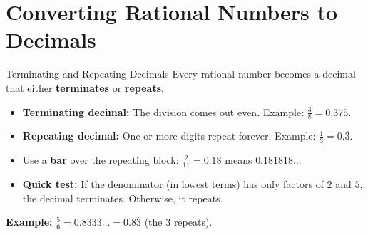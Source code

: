 \section{Converting Rational Numbers to Decimals}

\begin{quickReview}{Terminating and Repeating Decimals}
Every rational number becomes a decimal that either \textbf{terminates} or \textbf{repeats}.

\begin{itemize}[leftmargin=*]
    \item \textbf{Terminating decimal:} The division comes out even. Example: $\frac{3}{8} = 0.375$.
    \item \textbf{Repeating decimal:} One or more digits repeat forever. Example: $\frac{1}{3} = 0.\overline{3}$.
    \item Use a \textbf{bar} over the repeating block: $\frac{2}{11} = 0.\overline{18}$ means $0.181818\ldots$
    \item \textbf{Quick test:} If the denominator (in lowest terms) has only factors of $2$ and $5$, the decimal terminates. Otherwise, it repeats.
\end{itemize}

\medskip
\textbf{Example:} $\frac{5}{6} = 0.8333\ldots = 0.8\overline{3}$ \quad (the $3$ repeats).
\end{quickReview}

